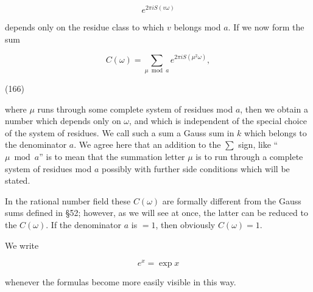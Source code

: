 $$e^{2\pi i S(v\omega)}$$

depends only on the residue class to which $v$ belongs mod $a$. If we now form the sum

$$C(\omega) = \sum_{\mu \bmod a} e^{2\pi i S(\mu^2\omega)},$$

(166)

where $\mu$ runs through some complete system of residues mod $a$, then we obtain a number which depends only on $\omega$, and which is independent of the special choice of the system of residues. We call such a sum a Gauss sum in $k$ which belongs to the denominator $a$. We agree here that an addition to the $\sum$ sign, like “$\mu \bmod a$” is to mean that the summation letter $\mu$ is to run through a complete system of residues mod $a$ possibly with further side conditions which will be stated.

In the rational number field these $C(\omega)$ are formally different from the Gauss sums defined in §52; however, as we will see at once, the latter can be reduced to the $C(\omega)$. If the denominator $a$ is $= 1$, then obviously $C(\omega) = 1$.

We write

$$e^x = \exp x$$

whenever the formulas become more easily visible in this way.
